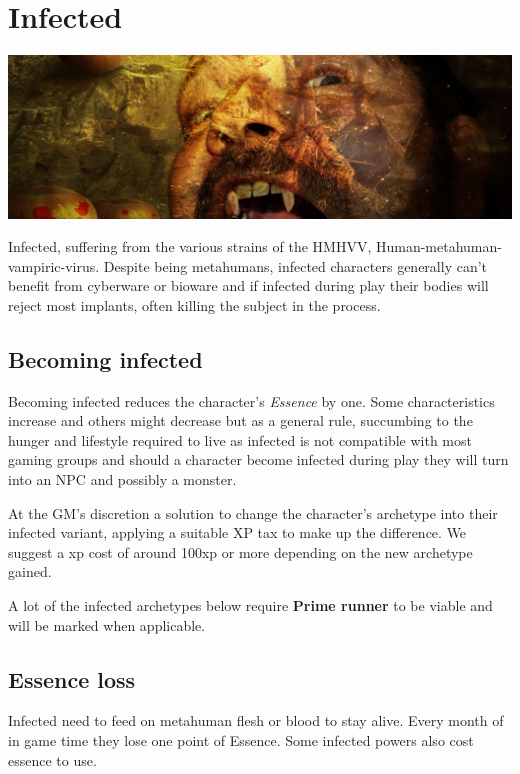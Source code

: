 \documentclass{book}
\begin{document}
\section{Infected}
\begin{center}
	\includegraphics[width=1\linewidth]{images/piqsels.com-id-znuch}
\end{center}
\begin{multicols}{2}
Infected, suffering from the various strains of the HMHVV, Human-metahuman-vampiric-virus. Despite being metahumans, infected characters generally can't benefit from cyberware or bioware and if infected during play their bodies will reject most implants, often killing the subject in the process. 

\subsection{Becoming infected}
\label{sec:gettinginfected}
Becoming infected reduces the character's \textit{Essence} by one. Some characteristics increase and others might decrease but as a general rule, succumbing to the hunger and lifestyle required to live as infected is not compatible with most gaming groups and should a character become infected during play they will turn into an NPC and possibly a monster.

At the GM's discretion a solution to change the character's archetype into their infected variant, applying a suitable XP tax to make up the difference. We suggest a xp cost of around 100xp or more depending on the new archetype gained. 

A lot of the infected archetypes below require \textbf{Prime runner} to be viable and will be marked when applicable. 

\subsection{Essence loss}
\label{sec:essenseloss}
Infected need to feed on metahuman flesh or blood to stay alive. Every month of in game time they lose one point of Essence. Some infected powers also cost essence to use. 


\end{multicols}
\end{document}
